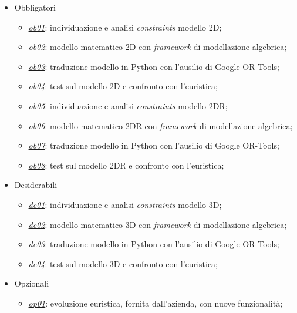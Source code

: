 \begin{itemize}
	\item Obbligatori
	      \begin{itemize}
	      	\item \underline{\textit{ob01}}: individuazione e analisi \textit{constraints} modello 2D;
	      	\item \underline{\textit{ob02}}: modello matematico 2D con \textit{framework} di modellazione algebrica;
	      	\item \underline{\textit{ob03}}: traduzione modello in Python con l'ausilio di Google OR-Tools;
	      	\item \underline{\textit{ob04}}: test sul modello 2D e confronto con l'euristica;
	      	\item \underline{\textit{ob05}}: individuazione e analisi \textit{constraints} modello 2DR; 
	      	\item \underline{\textit{ob06}}: modello matematico 2DR con \textit{framework} di modellazione algebrica;
	      	\item \underline{\textit{ob07}}: traduzione modello in Python con l'ausilio di Google OR-Tools;
	      	\item \underline{\textit{ob08}}: test sul modello 2DR e confronto con l'euristica;
	      \end{itemize}
	\item Desiderabili
	      \begin{itemize}
	      	\item \underline{\textit{de01}}: individuazione e analisi \textit{constraints} modello 3D;
	      	\item \underline{\textit{de02}}: modello matematico 3D con \textit{framework} di modellazione algebrica;
	      	\item \underline{\textit{de03}}: traduzione modello in Python con l'ausilio di Google OR-Tools;
	      	\item \underline{\textit{de04}}: test sul modello 3D e confronto con l'euristica;
	      \end{itemize}
	\item Opzionali
	      \begin{itemize}
	      	\item \underline{\textit{op01}}: evoluzione euristica, fornita dall'azienda, con nuove funzionalità;
	      \end{itemize} 
\end{itemize}

